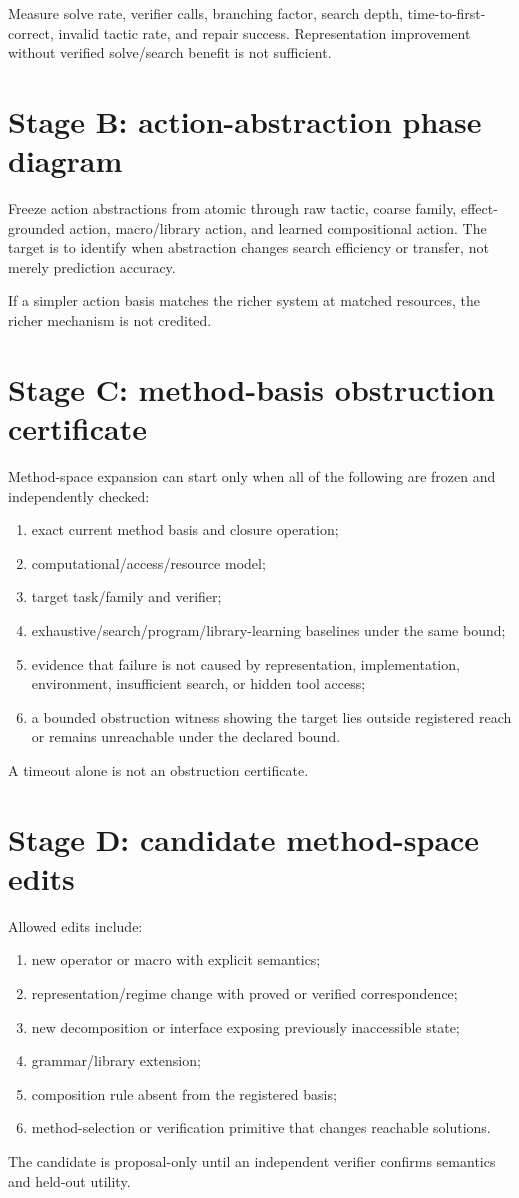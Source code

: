 \documentclass[11pt]{article}
\begin{document}
Measure solve rate, verifier calls, branching factor, search depth, time-to-first-correct, invalid tactic rate, and repair success. Representation improvement without verified solve/search benefit is not sufficient.

\section{Stage B: action-abstraction phase diagram}
Freeze action abstractions from atomic through raw tactic, coarse family, effect-grounded action, macro/library action, and learned compositional action. The target is to identify when abstraction changes search efficiency or transfer, not merely prediction accuracy.

If a simpler action basis matches the richer system at matched resources, the richer mechanism is not credited.

\section{Stage C: method-basis obstruction certificate}
Method-space expansion can start only when all of the following are frozen and independently checked:
\begin{enumerate}
    \item exact current method basis and closure operation;
    \item computational/access/resource model;
    \item target task/family and verifier;
    \item exhaustive/search/program/library-learning baselines under the same bound;
    \item evidence that failure is not caused by representation, implementation, environment, insufficient search, or hidden tool access;
    \item a bounded obstruction witness showing the target lies outside registered reach or remains unreachable under the declared bound.
\end{enumerate}
A timeout alone is not an obstruction certificate.

\section{Stage D: candidate method-space edits}
Allowed edits include:
\begin{enumerate}
    \item new operator or macro with explicit semantics;
    \item representation/regime change with proved or verified correspondence;
    \item new decomposition or interface exposing previously inaccessible state;
    \item grammar/library extension;
    \item composition rule absent from the registered basis;
    \item method-selection or verification primitive that changes reachable solutions.
\end{enumerate}
The candidate is proposal-only until an independent verifier confirms semantics and held-out utility.
\end{document}
